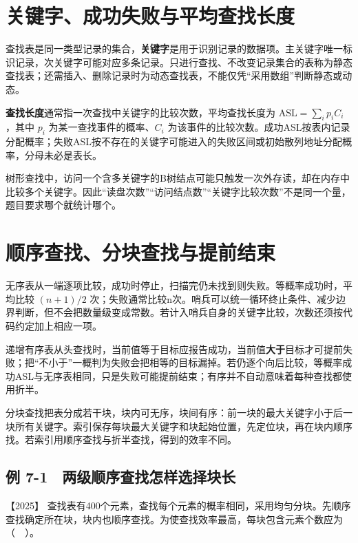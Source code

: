 \section{关键字、成功失败与平均查找长度}\label{ds-07-01}

查找表是同一类型记录的集合，\textbf{关键字}是用于识别记录的数据项。主关键字唯一标识记录，次关键字可能对应多条记录。只进行查找、不改变记录集合的表称为静态查找表；还需插入、删除记录时为动态查找表，不能仅凭``采用数组''判断静态或动态。

\textbf{查找长度}通常指一次查找中关键字的比较次数，平均查找长度为 \(\mathrm{ASL}=\sum_i p_iC_i\)，其中 \(p_i\) 为某一查找事件的概率、\(C_i\) 为该事件的比较次数。成功ASL按表内记录分配概率；失败ASL按不存在的关键字可能进入的失败区间或初始散列地址分配概率，分母未必是表长。

树形查找中，访问一个含多关键字的B树结点可能只触发一次外存读，却在内存中比较多个关键字。因此``读盘次数''``访问结点数''``关键字比较次数''不是同一个量，题目要求哪个就统计哪个。

\section{顺序查找、分块查找与提前结束}\label{ds-07-02}

无序表从一端逐项比较，成功时停止，扫描完仍未找到则失败。等概率成功时，平均比较 \((n+1)/2\) 次；失败通常比较n次。哨兵可以统一循环终止条件、减少边界判断，但不会把数量级变成常数。若计入哨兵自身的关键字比较，次数还须按代码约定加上相应一项。

递增有序表从头查找时，当前值等于目标应报告成功，当前值\textbf{大于}目标才可提前失败；把``不小于''一概判为失败会把相等的目标漏掉。若仍逐个向后比较，等概率成功ASL与无序表相同，只是失败可能提前结束；有序并不自动意味着每种查找都使用折半。

分块查找把表分成若干块，块内可无序，块间有序：前一块的最大关键字小于后一块所有关键字。索引保存每块最大关键字和块起始位置，先定位块，再在块内顺序找。若索引用顺序查找与折半查找，得到的效率不同。


\subsection{例 7-1　两级顺序查找怎样选择块长}\label{ds-ex7-1}

\noindent{}【2025】 查找表有400个元素，查找每个元素的概率相同，采用均匀分块。先顺序查找确定所在块，块内也顺序查找。为使查找效率最高，每块包含元素个数应为（　）。

